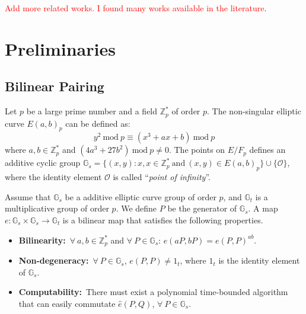 \documentclass[10pt,journal,letterpaper]{IEEEtran}
\begin{document}
\textcolor{red}{Add more related works. I found many works available
in the literature}.



\section{Preliminaries}
\label{L3}
\subsection{Bilinear Pairing}
Let $p$ be a large prime number and a field $\mathbb{Z}^{*}_{p}$ of
order $p$. The non-singular elliptic curve $E(a,b)_{p}$ can be
defined as:
\begin{equation*}
y^2~\mbox{mod}~p\equiv (x^3 + ax + b)~\mbox{mod}~p
\end{equation*}
where $a,b\in\mathbb{Z}_{p}^{*}$ and $(4a^3 +
27b^2)~\mbox{mod}~p\neq 0$. The points on $E/F_{p}$ defines an
additive cyclic group $\mathbb{G}_s = \{(x, y): x, x \in
\mathbb{Z}^{*}_{p}~\mbox{and}~(x,y)\in E(a,b)_{p}\}\cup
\{\mathcal{O}\}$, where the identity element $\mathcal{O}$ is called
``\emph{point of infinity}''.

Assume that $\mathbb{G}_s$ be a additive elliptic curve group of
order $p$, and $\mathbb{G}_t$ is a multiplicative group of order
$p$. We define $P$ be the generator of  $\mathbb{G}_{s}$. A map $e:
\mathbb{G}_s \times \mathbb{G}_s \xrightarrow{} \mathbb{G}_t$ is a
bilinear map that satisfies the following properties.

\begin{itemize}
\item \textbf{Bilinearity:}~$\forall~a,b\in\mathbb{Z}_{p}^{*}$
and $\forall~P\in\mathbb{G}_s$: $e(aP, bP) = e(P,P)^{ab}$.

\item \textbf{Non-degeneracy:}~$\forall~P\in\mathbb{G}_s$,
$e(P, P)\neq 1_{t}$, where $1_{t}$ is the identity element of
$\mathbb{G}_s$.

\item \textbf{Computability:}~There must exist a polynomial
time-bounded algorithm that can easily commutate $\hat{e}(P,Q)$,
$\forall~P\in\mathbb{G}_s$.
\end{itemize}
\end{document}
